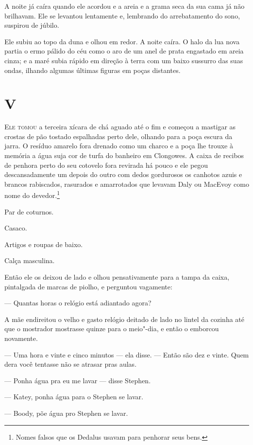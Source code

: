 A noite já caíra quando ele acordou e a areia e a grama seca da sua cama
já não brilhavam. Ele se levantou lentamente e, lembrando do
arrebatamento do sono, suspirou de júbilo.

Ele subiu ao topo da duna e olhou em redor. A noite caíra. O halo da lua
nova partia o ermo pálido do céu como o aro de um anel de prata engastado
em areia cinza; e a maré subia rápido em direção à terra com um baixo
sussurro das suas ondas, ilhando algumas últimas figuras em poças
distantes.


\chapter{V}

\textsc{Ele tomou} a terceira xícara de chá aguado até o fim e começou a mastigar
as crostas de pão tostado espalhadas perto dele, olhando para a poça
escura da jarra. O resíduo amarelo fora drenado como um charco e a poça
lhe trouxe à memória a água suja cor de turfa do banheiro em Clongowes.
A caixa de recibos de penhora perto do seu cotovelo fora revirada há
pouco e ele pegou descansadamente um depois do outro com dedos
gordurosos os canhotos azuis e brancos rabiscados, rasurados e
amarrotados que levavam Daly ou MacEvoy como nome do devedor.\footnote{ Nomes falsos 
que os Dedalus usavam para penhorar seus bens.}
\smallskip

 Par de coturnos.

 Casaco.

 Artigos e roupas de baixo.

 Calça masculina.
\smallskip

Então ele os deixou de lado e olhou pensativamente para a tampa da
caixa, pintalgada de marcas de piolho, e perguntou vagamente:

 --- Quantas horas o relógio está adiantado agora?

A mãe endireitou o velho e gasto relógio deitado de lado no lintel da
cozinha até que o mostrador mostrasse quinze para o meio"-dia, e então o
emborcou novamente.

 --- Uma hora e vinte e cinco minutos --- ela disse. --- Então são dez e vinte.
Quem dera você tentasse não se atrasar pras aulas.

 --- Ponha água pra eu me lavar --- disse Stephen.

 --- Katey, ponha água para o Stephen se lavar.

 --- Boody, põe água pro Stephen se lavar.

